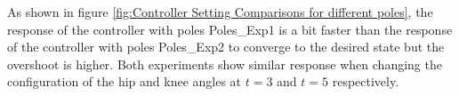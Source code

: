 As shown in figure \ref{fig:Controller Setting Comparisons for different poles}, the response of the controller with poles Poles\_Exp1 is a bit faster than the response of the controller with poles Poles\_Exp2 to converge to the desired state but the overshoot is higher. Both experiments show similar response when changing the configuration of the hip and knee angles at $t=3$ and $t=5$ respectively.









	



